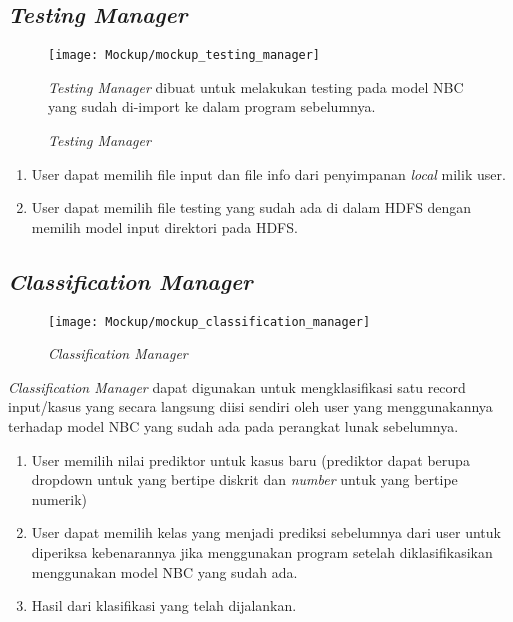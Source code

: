\subsection{\textit{Testing Manager}}
\begin{figure}[H]
	\centering
	\texttt{[image: Mockup/mockup\_testing\_manager]}
	\caption[\textit{Testing Manager}]{\textit{Testing Manager}}
	\label{fig:Testing Manager}
\textit{Testing Manager} dibuat untuk melakukan testing pada model NBC yang sudah di-import ke dalam program sebelumnya.
\end{figure}
\begin{enumerate}
	\item User dapat memilih file input dan file info dari penyimpanan \textit{local} milik user.
	\item User dapat memilih file testing yang sudah ada di dalam HDFS dengan memilih model input direktori pada HDFS.
\end{enumerate}

\subsection{\textit{Classification Manager}}
\begin{figure}[H]
	\centering
	\texttt{[image: Mockup/mockup\_classification\_manager]}
	\caption[\textit{Classification Manager}]{\textit{Classification Manager}}
	\label{fig:Classification Manager}
\end{figure}
\textit{Classification Manager} dapat digunakan untuk mengklasifikasi satu record input/kasus yang secara langsung diisi sendiri oleh user yang menggunakannya terhadap model NBC yang sudah ada pada perangkat lunak sebelumnya.
\begin{enumerate}
	\item User memilih nilai prediktor untuk kasus baru (prediktor dapat berupa dropdown untuk yang bertipe diskrit dan \textit{number} untuk yang bertipe numerik)
	\item User dapat memilih kelas yang menjadi prediksi sebelumnya dari user untuk diperiksa kebenarannya jika menggunakan program setelah diklasifikasikan menggunakan model NBC yang sudah ada.
	\item Hasil dari klasifikasi yang telah dijalankan.
\end{enumerate}

